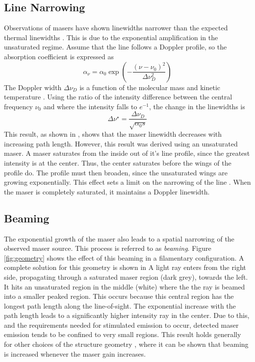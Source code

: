 \subsection{Line Narrowing}
\label{sub:line_narrow}

Observations of masers have shown linewidths narrower than the expected thermal linewidths \citep[][e.g.,]{Elitzur_1992, stahler_palla_2004}. This is due to the exponential amplification in the unsaturated regime. Assume that the line follows a Doppler profile, so the absorption coefficient is expressed as
\begin{equation}
\label{eq:doppler_profile}
\alpha_\nu = \alpha_0 \exp\left( -\frac{(\nu - \nu_0)^2}{\Delta\nu_D^2} \right)
\end{equation}
The Doppler width $\Delta\nu_D$ is a function of the molecular mass and kinetic temperature \citep{stahler_palla_2004}. Using the ratio of the intensity difference between the central frequency $\nu_0$ and where the intensity falls to $e^{-1}$, the change in the linewidths is
\begin{equation}
\label{eq:line_narrow}
\Delta\nu^\star = \frac{\Delta\nu_D}{\sqrt{\alpha_0 s}}
\end{equation}
This result, as shown in \citet{stahler_palla_2004}, shows that the maser linewidth decreases with increasing path length. However, this result was derived using an unsaturated maser. A maser saturates from the inside out of it's line profile, since the greatest intensity is at the center. Thus, the center saturates before the wings of the profile do. The profile must then broaden, since the unsaturated wings are growing exponentially. This effect sets a limit on the narrowing of the line \citep{Elitzur_1992, stahler_palla_2004}. When the maser is completely saturated, it maintains a Doppler linewidth. 

\subsection{Beaming}
\label{sub:beaming}

The exponential growth of the maser also leads to a spatial narrowing of the observed maser source. This process is referred to as {\it beaming}. Figure \ref{fig:geometry} shows the effect of this beaming in a filamentary configuration. A complete solution for this geometry is shown in \citet{Elitzur_1991} A light ray enters from the right side, propagating through a saturated maser region (dark grey), towards the left. It hits an unsaturated region in the middle (white) where the the ray is beamed into a smaller peaked region. This occurs because this central region has the longest path length along the line-of-sight. The exponential increase with the path length leads to a significantly higher intensity ray in the center. Due to this, and the requirements needed for stimulated emission to occur, detected maser emission tends to be confined to very small regions. This result holds generally for other choices of the structure geometry \citep{Elitzur_1990_paperII}, where it can be shown that beaming is increased whenever the maser gain increases.

